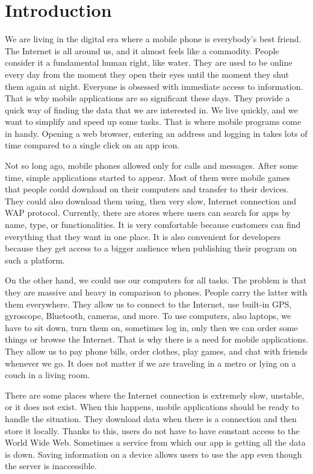 \chapter{Introduction}
We are living in the digital era where a mobile phone is everybody's best friend. The Internet is all around us, and it almost feels like a commodity. People consider it a fundamental human right, like water. They are used to be online every day from the moment they open their eyes until the moment they shut them again at night. Everyone is obsessed with immediate access to information. That is why mobile applications are so significant these days. They provide a quick way of finding the data that we are interested in. We live quickly, and we want to simplify and speed up some tasks. That is where mobile programs come in handy. Opening a web browser, entering an address and logging in takes lots of time compared to a single click on an app icon.

Not so long ago, mobile phones allowed only for calls and messages. After some time, simple applications started to appear. Most of them were mobile games that people could download on their computers and transfer to their devices. They could also download them using, then very slow, Internet connection and WAP protocol. Currently, there are stores where users can search for apps by name, type, or functionalities. It is very comfortable because customers can find everything that they want in one place. It is also convenient for developers because they get access to a bigger audience when publishing their program on such a platform.

On the other hand, we could use our computers for all tasks. The problem is that they are massive and heavy in comparison to phones. People carry the latter with them everywhere. They allow us to connect to the Internet, use built-in GPS, gyroscope, Bluetooth, cameras, and more. To use computers, also laptops, we have to sit down, turn them on, sometimes log in, only then we can order some things or browse the Internet. That is why there is a need for mobile applications. They allow us to pay phone bills, order clothes, play games, and chat with friends whenever we go. It does not matter if we are traveling in a metro or lying on a couch in a living room.

There are some places where the Internet connection is extremely slow, unstable, or it does not exist. When this happens, mobile applications should be ready to handle the situation. They download data when there is a connection and then store it locally. Thanks to this, users do not have to have constant access to the World Wide Web. Sometimes a service from which our app is getting all the data is down. Saving information on a device allows users to use the app even though the server is inaccessible.

